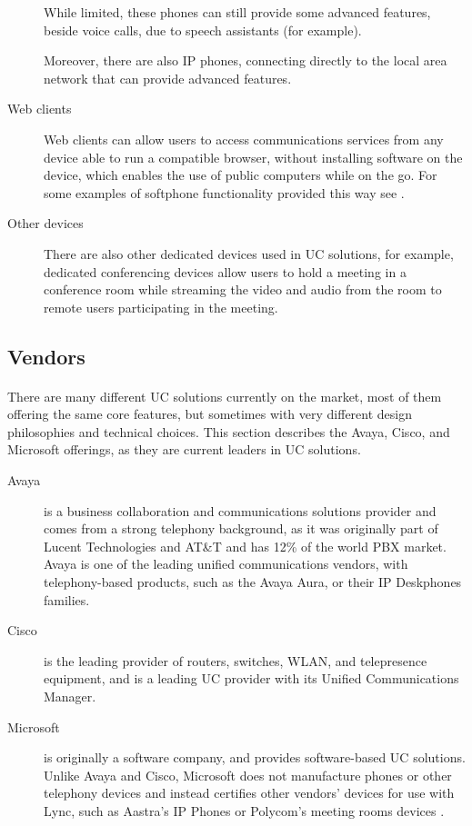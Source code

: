 \begin{description}
While limited, these phones can still provide some advanced features, beside voice calls, due to speech assistants (for example).

Moreover, there are also IP phones, connecting directly to the local area network that can provide advanced features.\cite{desantis_understanding_2008}



\item[Web clients]
Web clients can allow users to access communications services from any device able to run a compatible browser, without installing software on the device, which enables the use of public computers while on the go. For some examples of softphone functionality provided this way see \cite{arumugam_mathivanan_minisip_2012}.

\item[Other devices]
There are also other dedicated devices used in UC solutions, for example, dedicated conferencing devices allow users to hold a meeting in a conference room while streaming the video and audio from the room to remote users participating in the meeting.

\end{description}


\subsection{Vendors}
\paragraph{}
There are many different UC solutions currently on the market, most of them offering the same core features, but sometimes with very different design philosophies and technical choices. This section describes the Avaya, Cisco, and Microsoft offerings, as they are current leaders in UC solutions.

\begin{description}
\item[Avaya]
is a business collaboration and communications solutions provider and comes from a strong telephony background, as it was originally part of Lucent Technologies and AT\&T and has 12\% of the world PBX market\cite{elizabeth_harrin_unified_2013}. Avaya is one of the leading unified communications vendors, with telephony-based products, such as the Avaya Aura, or their IP Deskphones families\cite{_avaya_2012}.


\item[Cisco]
is the leading provider of routers, switches, WLAN, and telepresence equipment, and is a leading UC provider with its Unified Communications Manager\cite{elizabeth_harrin_unified_2013, _cisco_????}.


\item[Microsoft]
is originally a software company, and provides software-based UC solutions. Unlike Avaya and Cisco, Microsoft does not manufacture phones or other telephony devices and instead certifies other vendors' devices for use with Lync, such as Aastra's IP Phones or Polycom's meeting rooms devices
\cite{microsoft_technet_phones_2013}.
\end{description}


